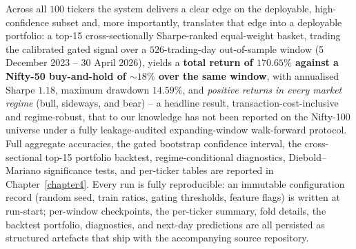     Across all $100$ tickers the system delivers a clear edge on the deployable, high-confidence subset and, more importantly, translates that edge into a deployable portfolio: a top-15 cross-sectionally Sharpe-ranked equal-weight basket, trading the calibrated gated signal over a $526$-trading-day out-of-sample window (5 December 2023 -- 30 April 2026), yields a \textbf{total return of $\mathbf{170.65\%}$ against a Nifty-50 buy-and-hold of $\sim$$18\%$ over the same window}, with annualised Sharpe $1.18$, maximum drawdown $14.59\%$, and \emph{positive returns in every market regime} (bull, sideways, and bear) -- a headline result, transaction-cost-inclusive and regime-robust, that to our knowledge has not been reported on the Nifty-100 universe under a fully leakage-audited expanding-window walk-forward protocol. Full aggregate accuracies, the gated bootstrap confidence interval, the cross-sectional top-15 portfolio backtest, regime-conditional diagnostics, Diebold--Mariano significance tests, and per-ticker tables are reported in Chapter~\ref{chapter4}. Every run is fully reproducible: an immutable configuration record (random seed, train ratios, gating thresholds, feature flags) is written at run-start; per-window checkpoints, the per-ticker summary, fold details, the backtest portfolio, diagnostics, and next-day predictions are all persisted as structured artefacts that ship with the accompanying source repository.
    \clearpage

